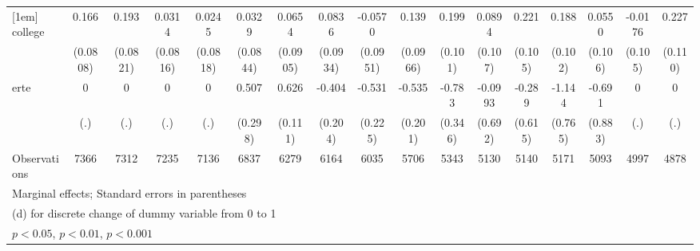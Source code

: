 {\begin{tabular}{l*{16}{c}}
[1em]
college             &       0.166\sym{*}  &       0.193\sym{*}  &      0.0314         &      0.0245         &      0.0329         &      0.0654         &      0.0836         &     -0.0570         &       0.139         &       0.199\sym{*}  &      0.0894         &       0.221\sym{*}  &       0.188         &      0.0550         &     -0.0176         &       0.227\sym{*}  \\
                    &    (0.0808)         &    (0.0821)         &    (0.0816)         &    (0.0818)         &    (0.0844)         &    (0.0905)         &    (0.0934)         &    (0.0951)         &    (0.0966)         &     (0.101)         &     (0.107)         &     (0.105)         &     (0.102)         &     (0.106)         &     (0.105)         &     (0.110)         \\
[1em]
erte                &           0         &           0         &           0         &           0         &       0.507         &       0.626\sym{***}&      -0.404\sym{*}  &      -0.531\sym{*}  &      -0.535\sym{**} &      -0.783\sym{*}  &     -0.0993         &      -0.289         &      -1.144         &      -0.691         &           0         &           0         \\
                    &         (.)         &         (.)         &         (.)         &         (.)         &     (0.298)         &     (0.111)         &     (0.204)         &     (0.225)         &     (0.201)         &     (0.346)         &     (0.692)         &     (0.615)         &     (0.765)         &     (0.883)         &         (.)         &         (.)         \\
\hline
Observations        &        7366         &        7312         &        7235         &        7136         &        6837         &        6279         &        6164         &        6035         &        5706         &        5343         &        5130         &        5140         &        5171         &        5093         &        4997         &        4878         \\
\hline\hline
\multicolumn{17}{l}{\footnotesize Marginal effects; Standard errors in parentheses}\\
\multicolumn{17}{l}{\footnotesize  (d) for discrete change of dummy variable from 0 to 1}\\
\multicolumn{17}{l}{\footnotesize \sym{*} \(p<0.05\), \sym{**} \(p<0.01\), \sym{***} \(p<0.001\)}\\
\end{tabular}
}
